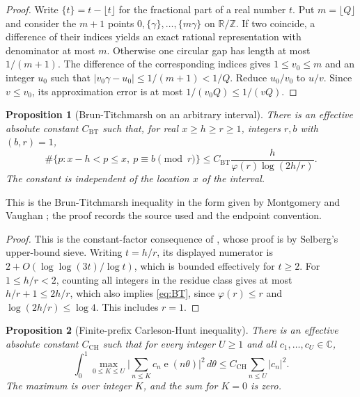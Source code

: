 \documentclass[11pt]{amsart}
\numberwithin{equation}{section}
\numberwithin{figure}{section}
\newtheorem{proposition}{Proposition}[section]
\theoremstyle{definition}
\newcommand{\Z}{\mathbb{Z}}
\newcommand{\R}{\mathbb{R}}
\newcommand{\C}{\mathbb{C}}
\newcommand{\e}{\operatorname{e}}
\begin{document}
\begin{proof}
Write $\{t\}=t-\lfloor t\rfloor$ for the fractional part of a real
number $t$. Put $m=\lfloor Q\rfloor$ and consider the $m+1$ points
$0,\{\gamma\},\ldots,\{m\gamma\}$ on $\R/\Z$.
If two coincide, a difference of their indices yields an exact rational
representation with denominator at most $m$.
Otherwise one circular gap has length at most $1/(m+1)$.
The difference of the corresponding indices gives $1\le v_0\le m$ and
an integer $u_0$ such that
$|v_0\gamma-u_0|\le1/(m+1)<1/Q$.
Reduce $u_0/v_0$ to $u/v$. Since $v\le v_0$, its approximation error is
at most $1/(v_0Q)\le1/(vQ)$.
\end{proof}

\begin{proposition}[Brun-Titchmarsh on an arbitrary interval]\label{prop:BT}
There is an effective absolute constant $C_\mathrm{BT}$ such that, for
real $x\ge h\ge r\ge1$, integers $r,b$ with $(b,r)=1$,
\begin{equation}\label{eq:BT}
 \#\{p:x-h<p\le x,\ p\equiv b\pmod r\}
 \le C_\mathrm{BT}\frac{h}{\varphi(r)\log(2h/r)}.
\end{equation}
The constant is independent of the location $x$ of the interval.
\end{proposition}

This is the Brun-Titchmarsh inequality in the form given by
Montgomery and Vaughan \cite{MV2}; the proof records the source used and
the endpoint convention.

\begin{proof}
This is the constant-factor consequence of
\cite[Theorem~21.4, p.~219]{Kouk}, whose proof is by Selberg's upper-bound
sieve. Writing $t=h/r$, its displayed numerator is
$2+O(\log\log(3t)/\log t)$, which is bounded effectively for $t\ge2$. For $1\le h/r<2$, counting
all integers in the residue class gives at most $h/r+1\le2h/r$,
which also implies \eqref{eq:BT}, since $\varphi(r)\le r$ and
$\log(2h/r)\le\log4$. This includes $r=1$.
\end{proof}

\begin{proposition}[Finite-prefix Carleson-Hunt inequality]\label{prop:CH}
There is an effective absolute constant $C_\mathrm{CH}$ such that for every integer
$U\ge1$ and all $c_1,\ldots,c_U\in\C$,
\begin{equation}\label{eq:CH}
 \int_0^1\max_{0\le K\le U}
 \bigg|\sum_{n\le K}c_n\e(n\theta)\bigg|^2\,d\theta
 \le C_\mathrm{CH}\sum_{n\le U}|c_n|^2.
\end{equation}
The maximum is over integer $K$, and the sum for $K=0$ is zero.
\end{proposition}
\end{document}
